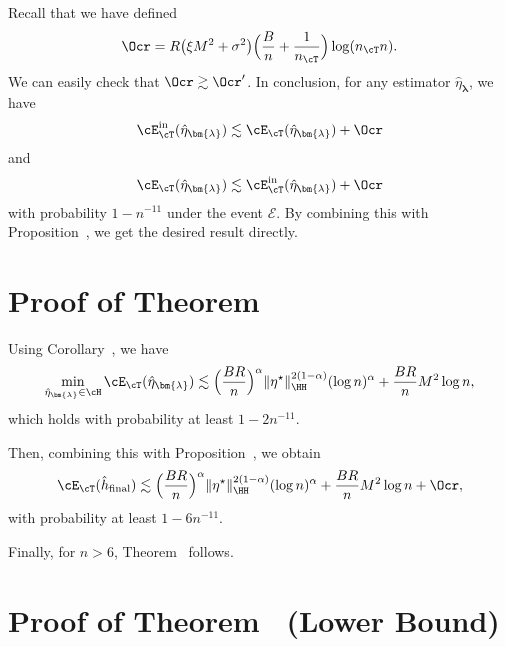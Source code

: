 \documentclass[12pt,a4paper,pdftex,onepage]{article}
\newcommand{\inn}{\operatorname{in}}
\newcommand{\sig}{\sigma}
\newcommand{\event}{\mathscr{E}}
\begin{document}
Recall that we have defined
\[
\Ocr =R \bigl(\xi M^2 + \sig^2 \bigr) \Bigl(\frac{B}{n} +\frac{1}{n_{\cT}}\Bigr)\log (n_\cT n).
\]
We can easily check that \(\Ocr \gtrsim \Ocr'\).
In conclusion, for any estimator $\hat{\eta}_{\bm{\lambda}}$, we have 
\begin{align*}
\cE_\cT^{\inn}(\hat{\eta}_{\bm{\lambda}}) \lesssim \cE_\cT(\hat{\eta}_{\bm{\lambda}}) +\Ocr
\end{align*}
and 
\begin{align*}
\cE_\cT(\hat{\eta}_{\bm{\lambda}}) \lesssim  \cE_\cT^{\inn}(\hat{\eta}_{\bm{\lambda}}) +\Ocr  
\end{align*}
with probability $1-n^{-11}$ under the event $\event$.
By combining this with Proposition~, we get the desired result directly.

\hfill \BlackBox






\section{Proof of Theorem~}\label{section; proof main theorem}

Using Corollary~, 
we have
\[
\min_{\hat{\eta}_{\bm{\lambda}} \in \cH} \cE_{\cT}(\hat{\eta}_{\bm{\lambda}})
\lesssim
\Bigl(\frac{BR}{n}\Bigr)^\alpha \|\eta^\star\|_\HH^{2(1-\alpha)} (\log n)^\alpha
+ \frac{BR}{n}M^2 \log n,
\]
which holds with probability at least \(1 - 2n^{-11}\).

Then, combining this with 
Proposition~, we obtain
\[
\cE_\cT(\hat{h}_{\operatorname{final}}) 
\lesssim  
\Bigl(\frac{BR}{n}\Bigr)^\alpha \|\eta^\star\|_\HH^{2(1-\alpha)} (\log n)^\alpha
+ \frac{BR}{n}M^2 \log n 
+ \Ocr,
\]
with probability at least \(1 - 6n^{-11}\).

Finally, for \(n > 6\), Theorem~ follows.


\hfill \BlackBox


\section{Proof of Theorem~ (Lower Bound)}\label{section; lower bound proof}
\end{document}

